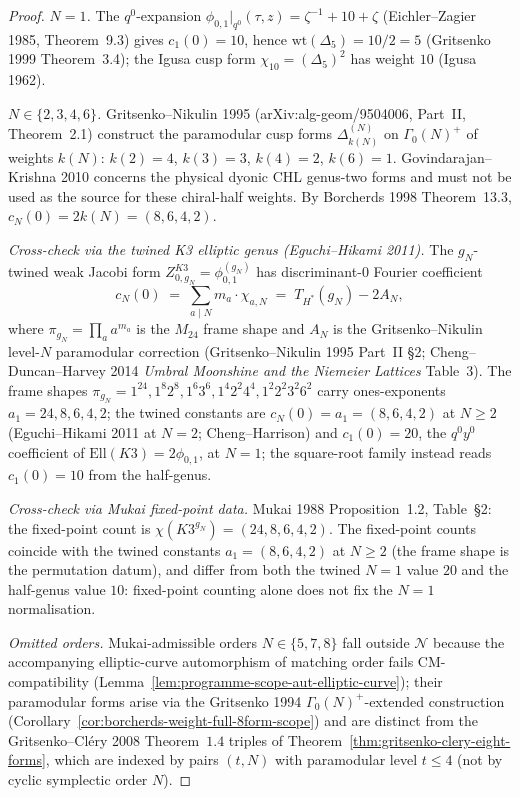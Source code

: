 \begin{proof}
\emph{$N=1$.} The $q^0$-expansion
$\phi_{0,1}|_{q^0}(\tau,z) = \zeta^{-1} + 10 + \zeta$
(Eichler--Zagier 1985, Theorem~9.3) gives $c_1(0) = 10$, hence
$\mathrm{wt}(\Delta_5) = 10/2 = 5$ (Gritsenko 1999 Theorem~3.4);
the Igusa cusp form $\chi_{10} = (\Delta_5)^2$ has weight $10$
(Igusa 1962).

\emph{$N \in \{2,3,4,6\}$.} Gritsenko--Nikulin 1995
(arXiv:alg-geom/9504006, Part~II, Theorem~2.1) construct the paramodular
cusp forms $\Delta_{k(N)}^{(N)}$ on $\Gamma_0(N)^+$ of weights $k(N)$:
$k(2) = 4$, $k(3) = 3$, $k(4) = 2$, $k(6) = 1$. Govindarajan--Krishna
2010 concerns the physical dyonic CHL genus-two forms and must not be
used as the source for these chiral-half weights. By Borcherds 1998
Theorem~13.3, $c_N(0) = 2 k(N) = (8, 6, 4, 2)$.

\emph{Cross-check via the twined K3 elliptic genus (Eguchi--Hikami 2011).}
The $g_N$-twined weak Jacobi form
$Z_{0,g_N}^{K3} = \phi_{0,1}^{(g_N)}$ has discriminant-$0$ Fourier
coefficient
\[
 c_N(0) \;=\; \sum_{a \mid N} m_a \cdot \chi_{a,N}
 \;=\; T_{H^*}(g_N) - 2 A_N,
\]
where $\pi_{g_N} = \prod_a a^{m_a}$ is the $M_{24}$ frame shape and
$A_N$ is the Gritsenko--Nikulin level-$N$ paramodular correction
(Gritsenko--Nikulin 1995 Part~II \S2; Cheng--Duncan--Harvey 2014
\emph{Umbral Moonshine and the Niemeier Lattices} Table~3). The frame
shapes $\pi_{g_N} = 1^{24}, 1^8 2^8, 1^6 3^6, 1^4 2^2 4^4, 1^2 2^2 3^2 6^2$
carry ones-exponents $a_1 = 24, 8, 6, 4, 2$; the twined constants are
$c_N(0) = a_1 = (8, 6, 4, 2)$ at $N \geq 2$ (Eguchi--Hikami 2011 at
$N = 2$; Cheng--Harrison) and $c_1(0) = 20$, the $q^0y^0$ coefficient
of $\mathrm{Ell}(K3) = 2\phi_{0,1}$, at $N = 1$; the square-root
family instead reads $c_1(0) = 10$ from the half-genus.

\emph{Cross-check via Mukai fixed-point data.} Mukai 1988
Proposition~1.2, Table~\S2: the fixed-point count is
$\chi(K3^{g_N}) = (24, 8, 6, 4, 2)$. The fixed-point counts coincide with the twined constants
$a_1 = (8, 6, 4, 2)$ at $N \geq 2$ (the frame shape is the
permutation datum), and differ from both the twined $N = 1$ value
$20$ and the half-genus value $10$: fixed-point counting alone does
not fix the $N = 1$ normalisation.

\emph{Omitted orders.} Mukai-admissible orders $N\in\{5,7,8\}$ fall
outside $\mathcal{N}$ because the accompanying elliptic-curve
automorphism of matching order fails CM-compatibility
(Lemma~\ref{lem:programme-scope-aut-elliptic-curve}); their paramodular
forms arise via the Gritsenko 1994 $\Gamma_0(N)^+$-extended construction
(Corollary~\ref{cor:borcherds-weight-full-8form-scope}) and are
distinct from the Gritsenko--Cl\'ery 2008 Theorem~$1.4$ triples of
Theorem~\ref{thm:gritsenko-clery-eight-forms}, which are indexed by
pairs $(t, N)$ with paramodular level $t \leq 4$ (not by cyclic
symplectic order $N$).
\end{proof}


